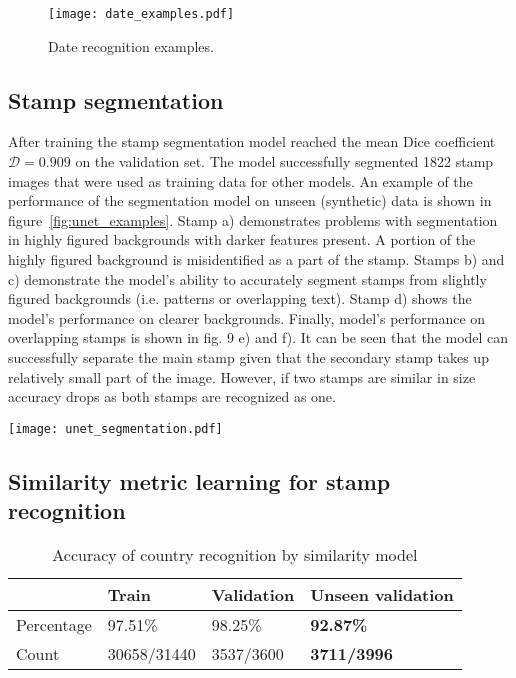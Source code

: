 \documentclass[twocolumn]{svjour3}
\begin{document}
\begin{figure}[tbp]
  \centering
  \texttt{[image: date\_examples.pdf]}
  \caption{Date recognition examples.}
  \label{fig:date_recognition_examples}
\end{figure}

\subsection{Stamp segmentation}

After training the stamp segmentation model reached the mean Dice coefficient $\mathcal{D} = 0.909$ on the validation set. The model successfully segmented 1822 stamp images that were used as training data for other models.
An example of the performance of the segmentation model on unseen (synthetic) data is shown in figure~\ref{fig:unet_examples}. Stamp a) demonstrates problems with segmentation in highly figured backgrounds with darker features present. A portion of the highly figured background is misidentified as a part of the stamp. Stamps b) and c) demonstrate the model’s ability to accurately segment stamps from slightly figured backgrounds (i.e. patterns or overlapping text). Stamp d) shows the model’s performance on clearer backgrounds. Finally, model’s performance on overlapping stamps is shown in fig. 9 e) and f). It can be seen that the model can successfully separate the main stamp given that the secondary stamp takes up relatively small part of the image. However, if two stamps are similar in size accuracy drops as both stamps are recognized as one.


\begin{figure*}
    \centering
    \texttt{[image: unet\_segmentation.pdf]}
    \caption{Pairs of inputs from the validation dataset and segmentation model outputs.}
    \label{fig:unet_examples}
\end{figure*}

\subsection{Similarity metric learning for stamp recognition}

\begin{table}
\centering
\caption{Accuracy of country recognition by similarity model}
\label{accuracy_country_dir}
\begin{tabular}{@{}llll@{}}
\toprule
 & Train & Validation & Unseen validation \\
\midrule
Percentage & 97.51\% & 98.25\% & \textbf{92.87\%} \\
Count & 30658/31440 & 3537/3600 & \textbf{3711/3996} \\
\bottomrule
\end{tabular}
\end{table}
\end{document}
